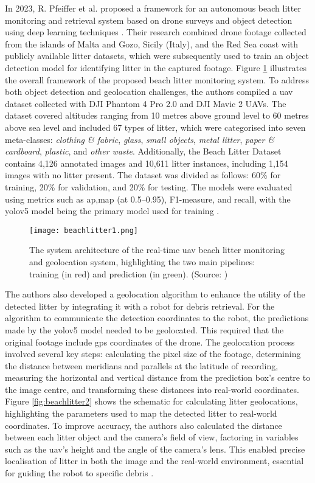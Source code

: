 In 2023, R. Pfeiffer et al. proposed a framework for an autonomous beach litter monitoring and retrieval system based on drone surveys and object detection using deep learning techniques \cite{beach_litter}. Their research combined drone footage collected from the islands of Malta and Gozo, Sicily (Italy), and the Red Sea coast with publicly available litter datasets, which were subsequently used to train an object detection model for identifying litter in the captured footage. Figure \ref{fig:beachlitter1} illustrates the overall framework of the proposed beach litter monitoring system. To address both object detection and geolocation challenges, the authors compiled a \gls{uav} dataset collected with DJI Phantom 4 Pro 2.0 and DJI Mavic 2 UAVs. The dataset covered altitudes ranging from 10 metres above ground level to 60 metres above sea level and included 67 types of litter, which were categorised into seven meta-classes: \textit{clothing \& fabric}, \textit{glass}, \textit{small objects}, \textit{metal litter}, \textit{paper \& cardboard}, \textit{plastic}, and \textit{other waste}.
Additionally, the Beach Litter Dataset contains 4,126 annotated images and 10,611 litter instances, including 1,154 images with no litter present. The dataset was divided as follows: 60\% for training, 20\% for validation, and 20\% for testing. The models were evaluated using metrics such as \gls{ap},\gls{map} (at 0.5–0.95), F1-measure, and recall, with the \gls{yolo}v5 model being the primary model used for training \cite{beach_litter}. 

\begin{figure}[!htbp]
    \centering
    \texttt{[image: beachlitter1.png]}
    \caption{The system architecture of the real-time \gls{uav} beach litter monitoring and geolocation system, highlighting the two main pipelines: training (in red) and prediction (in green). (Source: \cite{beach_litter})}
    \label{fig:beachlitter1}
\end{figure}

The authors also developed a geolocation algorithm to enhance the utility of the detected litter by integrating it with a robot for debris retrieval. For the algorithm to communicate the detection coordinates to the robot, the predictions made by the \gls{yolo}v5 model needed to be geolocated. This required that the original footage include \gls{gps} coordinates of the drone. The geolocation process involved several key steps: calculating the pixel size of the footage, determining the distance between meridians and parallels at the latitude of recording, measuring the horizontal and vertical distance from the prediction box's centre to the image centre, and transforming these distances into real-world coordinates. Figure \ref{fig:beachlitter2} shows the schematic for calculating litter geolocations, highlighting the parameters used to map the detected litter to real-world coordinates. To improve accuracy, the authors also calculated the distance between each litter object and the camera’s field of view, factoring in variables such as the \gls{uav}’s height and the angle of the camera’s lens. This enabled precise localisation of litter in both the image and the real-world environment, essential for guiding the robot to specific debris \cite{beach_litter}.

